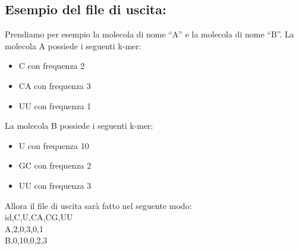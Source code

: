 \subsection{Esempio del file di uscita:}\label{subsec:esempio-del-file-di-uscita:}
Prendiamo per esempio la molecola di nome ``A'' e la molecola di nome ``B''.
La molecola A possiede i seguenti k-mer:
\begin{itemize}
    \item C con frequenza 2
    \item CA con frequenza 3
    \item UU con frequenza 1
\end{itemize}
La molecola B possiede i seguenti k-mer:
\begin{itemize}
    \item U con frequenza 10
    \item GC con frequenza 2
    \item UU con frequenza 3
\end{itemize}
Allora il file di uscita sar\`a fatto nel seguente modo:
\\
id,C,U,CA,CG,UU\\
A,2,0,3,0,1\\
B,0,10,0,2,3\\
